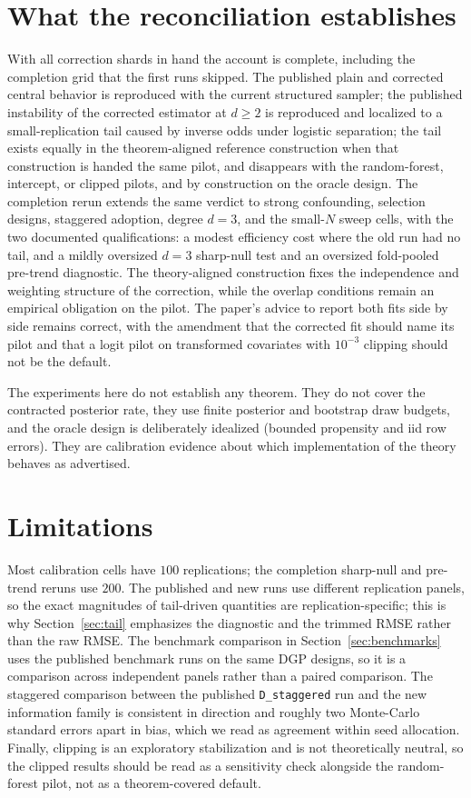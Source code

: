\documentclass[11pt]{article}
\begin{document}
\section{What the reconciliation establishes}
\label{sec:conclusion}

With all correction shards in hand the account is complete, including the
completion grid that the first runs skipped. The published plain and
corrected central behavior is reproduced with the current structured sampler; the
published instability of the corrected estimator at $d\ge2$ is reproduced and localized
to a small-replication tail caused by inverse odds under logistic separation; the tail
exists equally in the theorem-aligned reference construction when that construction is
handed the same pilot, and disappears with the random-forest, intercept, or clipped
pilots, and by construction on the oracle design. The completion rerun extends the
same verdict to strong confounding, selection designs, staggered adoption, degree
$d=3$, and the small-$N$ sweep cells, with the two documented qualifications: a
modest efficiency cost where the old run had no tail, and a mildly oversized
$d=3$ sharp-null test and an oversized fold-pooled pre-trend diagnostic. The theory-aligned construction fixes
the independence and weighting structure of the correction, while the overlap conditions
remain an empirical obligation on the pilot. The paper's advice to report both fits side
by side remains correct, with the amendment that the corrected fit should name its pilot
and that a logit pilot on transformed covariates with $10^{-3}$ clipping should not be
the default.

The experiments here do not establish any theorem. They do not cover the contracted
posterior rate, they use finite
posterior and bootstrap draw budgets, and the oracle design is deliberately idealized
(bounded propensity and iid row errors). They are calibration evidence about which
implementation of the theory behaves as advertised.

\section{Limitations}
\label{sec:limitations}

Most calibration cells have $100$ replications; the completion sharp-null and
pre-trend reruns use $200$. The published and new runs use
different replication panels, so the exact magnitudes of tail-driven quantities are
replication-specific; this is why Section~\ref{sec:tail} emphasizes the diagnostic and
the trimmed RMSE rather than the raw RMSE. The benchmark comparison in
Section~\ref{sec:benchmarks} uses the published benchmark runs on the same DGP designs,
so it is a comparison across independent panels rather than a paired comparison. The
staggered comparison between the published \texttt{D\_staggered} run and the new
information family is consistent in direction and roughly two Monte-Carlo standard
errors apart in bias, which we read as agreement within seed allocation. Finally,
clipping is an exploratory stabilization and is not theoretically neutral, so the
clipped results should be read as a sensitivity check alongside the random-forest pilot,
not as a theorem-covered default.
\end{document}
